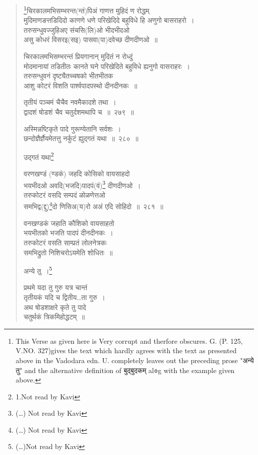 \documentclass[11pt, openany]{book}
\begin{document}
\begin{quote}
{\qt \renewcommand{\thefootnote}{*}\footnote{This Verse as given here is Very corrupt and therfore obscures. G. (P. 125, V.NO. 327)gives the text which hardly agrees with the text as presented above in the Vadodara edn. U. completely leaves out the preceding prose "अन्ये तु" and the alternative definition of बुद्बुदकम् al०g with the example given above. }चिरकालमभिसम्भरन्त(न्तं)पिअं गाणत्त मुहिदं ण रोद्धम् \\
मुदिमाणङत्तडिदिदो काणणे धणे परिखेदिदे बहुविधे हि अणुगो बासराहरो~। \\
तरुसन्धुवज्जुहिअए संचसि(लि)ओ भीदभीदओ\\
असु कोधरं विसरइ(सइ) पासवा(पा)दवेच्छ दीणदीणओ~॥

चिरकालमभिसम्भरन्तं प्रियगानान् मुदितं न रोध्दुं \\
मोदमानायां तडितीतः कानते घने परिखेदिते बहुविधे ह्यनुगो वासराहरः~। \\
तरुसन्धुवनं दृष्ट्यैतच्चषको भीतभीतक \\
आशु कोटरं विशति पार्श्वपादपस्थो दीनदीनकः~॥}

{\na तृतीयं पञ्चमं चैचैव नवमैकादशे तथा~। \\
द्वादशं षोडशं चैव चतुर्दशमथापि च~॥~२७९~॥ 

अस्मिन्नष्टिकृते पादे गुरूण्येतानि सर्वशः~।\\
छन्दोज्ञैर्ज्ञैयमेतत्तु नर्कुटं ह्युद्गतं यथा~॥~२८०~॥}

उद्गतं यथा\renewcommand{\thefootnote}{1}\footnote{1.Not read by Kavi}

{\na वरणखण्डं (ण्डकं) जहदि कोसिको वायसाहदो \\
भयभीदओ अवदि(भजदि)पादपं(वं)\renewcommand{\thefootnote}{2}\footnote{(\ldots ) Not read by Kavi} दीणदीणओ~। \\
तरुकोटरं वसदि सम्पदं ळोळणेत्तओ\\
समभिद्व(द्दु)\renewcommand{\thefootnote}{3}\footnote{(\ldots ) Not read by Kavi}दो णिसिअ(य)रो अअं एदि सोहिदो~॥~२८१~॥}

{\qt वनखण्डकं जहाति कौशिको वायसाहतो \\
भयभीतको भजति पादपं दीनदीनकः~।\\
तरुकोटरं वसति साम्प्रतं लोलनेत्रकः \\
समभिद्रुतो निशिचरोऽयमेति शोधितः~॥} 

अन्ये तु~।\renewcommand{\thefootnote}{4}\footnote{(\ldots )Not read by Kavi}

{\qt प्रथमे यदा तु गुरु यत्र चान्तं \\
 तृतीयकं यदि च द्वितीय\ldots ता गुरु~।\\
अथ षोडशाक्षरे कृते तु पादे\\
 चतुर्थकं त्रिकमिहोद्धटम्~॥}
\end{quote}
\end{document}
